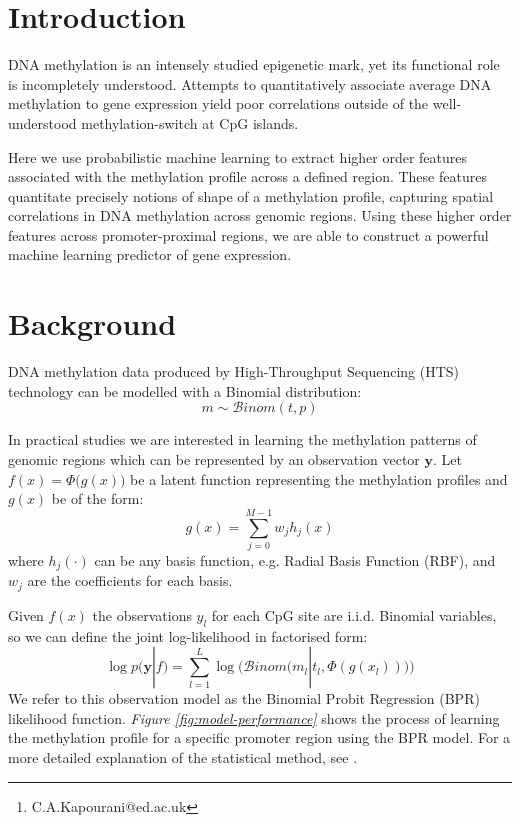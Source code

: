 \documentclass{article}\usepackage[]{graphicx}\usepackage[]{color}
\author{Chantriolnt-Andreas Kapourani\footnote{C.A.Kapourani@ed.ac.uk}}
\date{Modified: 1 August, 2016. Compiled: \today}
\begin{document}
\maketitle

\tableofcontents


\section{Introduction}
DNA methylation is an intensely studied epigenetic mark, yet its functional role is incompletely understood. Attempts to quantitatively associate average DNA methylation to gene expression yield poor correlations outside of the well-understood methylation-switch at CpG islands.

Here we use probabilistic machine learning to extract higher order features associated with the methylation profile across a defined region. These features quantitate precisely notions of shape of a methylation profile, capturing spatial correlations in DNA methylation across genomic regions.  Using these higher order features across promoter-proximal regions, we are able to construct a powerful machine learning predictor of gene expression.


\section{Background}
DNA methylation data produced by High-Throughput Sequencing (HTS) technology can be modelled with a Binomial distribution:
\begin{equation}
  m \sim \mathcal{B}inom(t, p)
\end{equation}

In practical studies we are interested in learning the methylation patterns of genomic regions which can be represented by an observation vector $\mathbf{y}$. Let $f(x) = \Phi \big(g(x)\big)$ be a latent function representing the methylation profiles and $g(x)$ be of the form:
\begin{equation}\label{eq-basis}
	 g(x) = \sum\limits_{j=0}^{M-1} w_{j} h_{j}(x)
\end{equation}
where $h_{j}(\cdot)$ can be any basis function, e.g. Radial Basis Function (RBF), and $w_{j}$ are the coefficients for each basis.

Given $f(x)$ the observations $y_{l}$ for each CpG site are i.i.d. Binomial variables, so we can define the joint log-likelihood in factorised form:
\begin{equation} \label{eq:bpr-likelihood}
 \log p(\mathbf{y} | f) = \sum\limits_{l = 1}^{L} \log \bigg( \mathcal{B}inom\big(m_{l} | t_{l}, \Phi(g(x_{l}))\big) \bigg)
\end{equation}
We refer to this observation model as the Binomial Probit Regression (BPR) likelihood function. \emph{Figure \ref{fig:model-performance}} shows the process of learning the methylation profile for a specific promoter region using the BPR model. For a more detailed explanation of the statistical method, see \cite{Kapourani2016}.
\end{document}
